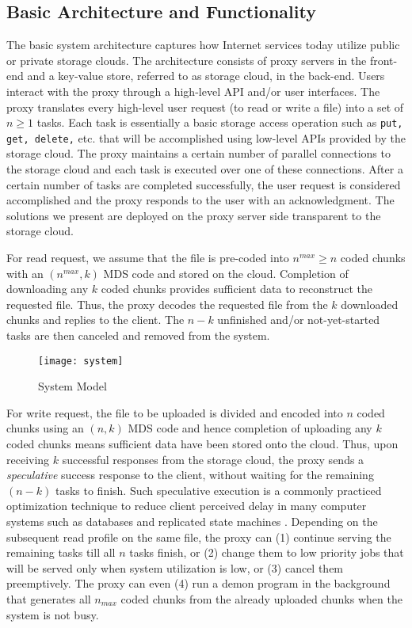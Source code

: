 \documentclass[journal]{IEEEtran}
\begin{document}
\subsection{Basic Architecture and Functionality}
The basic system architecture captures how Internet services today utilize public or private storage clouds.  The architecture consists of proxy servers in the front-end and a key-value store, referred to as  storage cloud, in the back-end. 
Users interact with the proxy through a high-level API and/or user interfaces.  
The proxy translates every high-level user request (to read or write a file) into a set of $n \ge 1$ tasks. Each task is essentially a basic storage access operation such as {\tt put, get, delete,} etc. that will be accomplished using low-level APIs provided by the storage cloud. The proxy maintains a certain number of parallel connections to the storage cloud and each task is executed over one of these connections. After a certain number of tasks are completed successfully, the user request is considered accomplished and the proxy responds to the user with an acknowledgment. The solutions we present are deployed on the proxy server side transparent to the storage cloud.

For read request, we assume that the file is pre-coded into $n^{max}\ge n$ coded chunks with an $(n^{max},k)$ MDS code and stored on the cloud. Completion of downloading any $k$ coded chunks provides sufficient data to reconstruct the requested file. Thus, the proxy decodes the requested file from the $k$ downloaded chunks and replies to the client. The $n-k$ unfinished and/or not-yet-started tasks are then canceled and removed from the system. 

\begin{figure}[!t]
\centering
\texttt{[image: system]}
\caption{System Model}
\label{fig:system}
\end{figure}

For write request, the file to be uploaded is divided and encoded into $n$ coded chunks using an $(n,k)$ MDS code and hence completion of uploading any $k$ coded chunks means sufficient data have been stored onto the cloud. 
Thus, upon receiving $k$ successful responses from the storage cloud, the proxy sends a {\em speculative} success response to the client, without waiting for the remaining $(n-k)$ tasks to finish.
Such speculative execution is a commonly practiced optimization technique to reduce client perceived delay in many computer systems such as databases and replicated state machines \cite{zyzzyva}.
Depending on the subsequent read profile on the same file, the proxy can (1) continue serving the remaining tasks till all $n$ tasks finish, or (2) change them to low priority jobs that will be served only when system utilization is low, or (3) cancel them preemptively. The proxy can even (4) run a demon program in the background that generates all $n_{max}$ coded chunks from the already uploaded chunks when the system is not busy.
\end{document}
